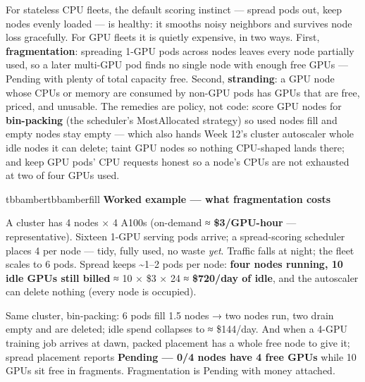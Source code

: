 For stateless CPU fleets, the default scoring instinct — spread pods out, keep nodes evenly loaded — is healthy: it smooths noisy neighbors and survives node loss gracefully. For GPU fleets it is quietly expensive, in two ways. First, \textbf{fragmentation}: spreading 1-GPU pods across nodes leaves every node partially used, so a later multi-GPU pod finds no single node with enough free GPUs — Pending with plenty of total capacity free. Second, \textbf{stranding}: a GPU node whose CPUs or memory are consumed by non-GPU pods has GPUs that are free, priced, and unusable. The remedies are policy, not code: score GPU nodes for \textbf{bin-packing} (the scheduler's MostAllocated strategy) so used nodes fill and empty nodes stay empty — which also hands Week 12's cluster autoscaler whole idle nodes it can delete; taint GPU nodes so nothing CPU-shaped lands there; and keep GPU pods' CPU requests honest so a node's CPUs are not exhausted at two of four GPUs used.

\begin{calloutbox}{tbbamber}{tbbamberfill}
{\normalsize\bfseries\color{tbbamberdark}Worked example — what fragmentation costs}\par\vspace{3pt}
A cluster has 4 nodes × 4 A100s (on-demand ≈ \textbf{\$3/GPU-hour} — representative). Sixteen 1-GPU serving pods arrive; a spread-scoring scheduler places 4 per node — tidy, fully used, no waste \textit{yet}. Traffic falls at night; the fleet scales to 6 pods. Spread keeps \textasciitilde{}1–2 pods per node: \textbf{four nodes running, 10 idle GPUs still billed} ≈ 10 × \$3 × 24 ≈ \textbf{\$720/day of idle}, and the autoscaler can delete nothing (every node is occupied).

Same cluster, bin-packing: 6 pods fill 1.5 nodes → two nodes run, two drain empty and are deleted; idle spend collapses to ≈ \$144/day. And when a 4-GPU training job arrives at dawn, packed placement has a whole free node to give it; spread placement reports \textbf{Pending — 0/4 nodes have 4 free GPUs} while 10 GPUs sit free in fragments. Fragmentation is Pending with money attached.
\end{calloutbox}

\vspace{3.0pt}

